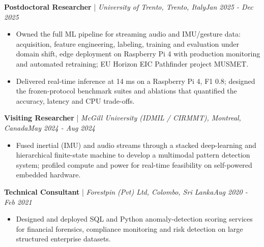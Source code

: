 \documentclass[11pt]{article}
\newenvironment{cvrole}[5]{%
  \par\noindent\textbf{\large #1} | \textit{\small #2, #3}\hfill \textit{\small #4 - #5}\par
  \begin{itemize}[leftmargin=2em, itemsep=-0.3em, topsep=-0.5em]%
}{%
  \end{itemize}\par\noindent\mbox{}\par\vspace{0.1em}%
}
\begin{document}
\begin{cvrole}{Postdoctoral Researcher}{University of Trento}{Trento, Italy}{Jan 2025}{Dec 2025}
    \item Owned the full ML pipeline for streaming audio and IMU/gesture data: acquisition, feature engineering, labeling, training and evaluation under domain shift, edge deployment on Raspberry Pi 4 with production monitoring and automated retraining; EU Horizon EIC Pathfinder project MUSMET.
    \item Delivered real-time inference at 14 ms on a Raspberry Pi 4, F1 0.8; designed the frozen-protocol benchmark suites and ablations that quantified the accuracy, latency and CPU trade-offs.
\end{cvrole}

\begin{cvrole}{Visiting Researcher}{McGill University (IDMIL / CIRMMT)}{Montreal, Canada}{May 2024}{Aug 2024}
    \item Fused inertial (IMU) and audio streams through a stacked deep-learning and hierarchical finite-state machine to develop a multimodal pattern detection system; profiled compute and power for real-time feasibility on self-powered embedded hardware.
\end{cvrole}

\begin{cvrole}{Technical Consultant}{Forestpin (Pvt) Ltd}{Colombo, Sri Lanka}{Aug 2020}{Feb 2021}
    \item Designed and deployed SQL and Python anomaly-detection scoring services for financial forensics, compliance monitoring and risk detection on large structured enterprise datasets.
\end{cvrole}
\end{document}
